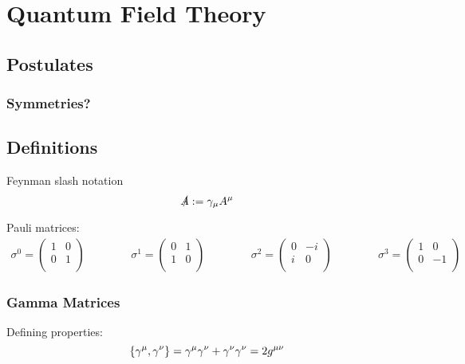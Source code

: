 \section{Quantum Field Theory} %
	\subsection{Postulates}
		\subsubsection{Symmetries?}
	\subsection{Definitions}
		Feynman slash notation
		\begin{equation}
			\slashed{A} := \gamma_\mu A^\mu
		\end{equation}

		\noindent
		Pauli matrices:
		\begin{equation}
			\begin{aligned}
				\sigma^0 = \left(\begin{matrix}
					1 & 0 \\
					0 & 1 \\
				\end{matrix}\right) &&\hspace{30pt}
				\sigma^1 = \left(\begin{matrix}
					0 & 1 \\
					1 & 0 \\
				\end{matrix}\right) &&\hspace{30pt}
				\sigma^2 = \left(\begin{matrix}
					0 & -i \\
						i & 0 \\
				\end{matrix}\right) &&\hspace{30pt}
				\sigma^3 = \left(\begin{matrix}
					1 & 0 \\
					0 & -1 \\
				\end{matrix}\right)
			\end{aligned}
		\end{equation}

		\subsubsection{Gamma Matrices}
			\noindent
			Defining properties:
			\begin{equation}
				\left\lbrace \gamma^\mu,\gamma^\nu \right\rbrace = \gamma^\mu \gamma^\nu + \gamma^\nu \gamma^\nu = 2g^{\mu\nu}
			\end{equation}

